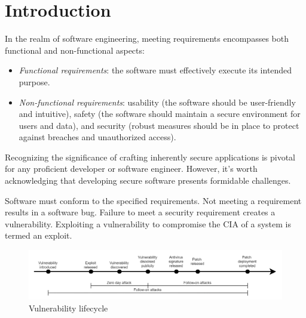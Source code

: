 \section{Introduction}

In the realm of software engineering, meeting requirements encompasses both functional and non-functional aspects:
\begin{itemize}
    \item \textit{Functional requirements}: the software must effectively execute its intended purpose.
    \item \textit{Non-functional requirements}: usability (the software should be user-friendly and intuitive), safety (the software should maintain a secure environment for users and data), and security (robust measures should be in place to protect against breaches and unauthorized access).
\end{itemize}
Recognizing the significance of crafting inherently secure applications is pivotal for any proficient developer or software engineer. 
However, it's worth acknowledging that developing secure software presents formidable challenges.

Software must conform to the specified requirements. 
Not meeting a requirement results in a software bug. 
Failure to meet a security requirement creates a vulnerability. 
Exploiting a vulnerability to compromise the CIA of a system is termed an exploit.

\begin{figure}[H]
    \centering
    \includegraphics[width=1.0\linewidth]{images/vulnerability.png}
    \caption{Vulnerability lifecycle}
\end{figure}


